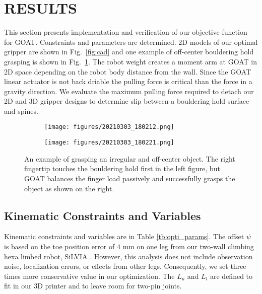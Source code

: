 \documentclass[letterpaper, 10 pt, conference]{ieeeconf}  %
\newcommand{\fig}[1]{Fig.~\ref{#1}}
\begin{document}
\section{RESULTS}\label{results}
This section presents implementation and verification of our objective function for GOAT. %
Constraints and parameters are determined. 2D models of our optimal gripper are shown in \fig{fig:cad} and one example of off-center bouldering hold grasping is shown in \fig{fig:opti_config}. The robot weight creates a moment arm at GOAT in 2D space depending on the robot body distance from the wall. Since the GOAT linear actuator is not back driable the pulling force is critical than the force in a gravity direction.
We evaluate the maximum pulling force required to detach our 2D and 3D gripper designs to determine slip between a bouldering hold surface and spines. 
\begin{figure}
    \begin{subfigure}{0.24\textwidth}
    \centering
\texttt{[image: figures/20210303\_180212.png]}
    \end{subfigure}
     \begin{subfigure}{0.24\textwidth}
         \centering
         \texttt{[image: figures/20210303\_180221.png]}
     \end{subfigure}
     \caption{An example of grasping an irregular and off-center object. The right fingertip touches the bouldering hold first in the left figure, but GOAT balances the finger load passively and successfully grasps the object as shown on the right.\label{fig:opti_config}}
\end{figure} 

\subsection{Kinematic Constraints and Variables}
Kinematic constraints and variables are in Table \ref{tb:opti_params}.
The offset $\psi$ is based on the toe position error of $4$ mm on one leg from our two-wall climbing hexa limbed robot, SiLVIA \cite{silvia}. However, this analysis does not include observation noise, localization errors, or effects from other legs. Consequently, we set three times more conservative value in our optimization. 
 The $L_{u}$ and $L_{l}$ are defined to fit in our 3D printer and to leave room for two-pin joints.
\end{document}
